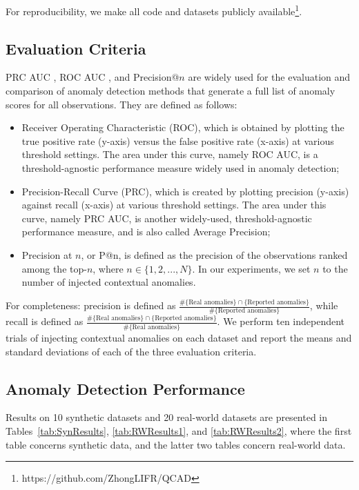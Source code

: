 \documentclass[pdflatex,sn-basic]{sn-jnl}%
\theoremstyle{thmstyleone}%
\theoremstyle{thmstyletwo}%
\theoremstyle{thmstylethree}%
\begin{document}
For reproducibility, we make all code and datasets publicly available\footnote{https://github.com/ZhongLIFR/QCAD}.

\subsection{Evaluation Criteria}
\label{subsec:metrics}

PRC AUC \citep{liang2016robust,kuo2018detecting}, ROC AUC \citep{micenkova2014learning, micenkova2015learning, pasillas2016unsupervised}, and Precision@$n$ \citep{aggarwal2017outlier} are widely used for the evaluation and comparison of anomaly detection methods that generate a full list of anomaly scores for all observations. They are defined as follows:
\begin{itemize}
    \item Receiver Operating Characteristic (ROC), which is obtained by plotting the true positive rate (y-axis) versus the false positive rate (x-axis) at various threshold settings. The area under this curve, namely ROC AUC, is a threshold-agnostic performance measure widely used in anomaly detection;
    \item Precision-Recall Curve (PRC), which is created by plotting precision (y-axis) against recall (x-axis) at various threshold settings. The area under this curve, namely PRC AUC, is another widely-used, threshold-agnostic performance measure, and is also called Average Precision;
    \item Precision at $n$, or P@n, is defined as the precision of the observations ranked among the top-$n$, where $n\in\{1,2,...,N\}$. In our experiments, we set $n$ to the number of injected contextual anomalies.
\end{itemize}
For completeness: precision is defined as $\frac{\#\{\text{Real anomalies}\} \cap \{\text{Reported anomalies}\}}{\#\{\text{Reported anomalies}\}}$, while recall is defined as $\frac{\#\{\text{Real anomalies}\} \cap \{\text{Reported anomalies}\}}{\#\{\text{Real anomalies}\}}$. We perform ten independent trials of injecting contextual anomalies on each dataset and report the means and standard deviations of each of the three evaluation criteria.

\subsection{Anomaly Detection Performance} \label{exp:ADPerformance}

Results on 10 synthetic datasets and 20 real-world datasets are presented in Tables~\ref{tab:SynResults}, \ref{tab:RWResults1}, and \ref{tab:RWResults2}, where the first table concerns synthetic data, and the latter two tables concern real-world data. 
\end{document}
